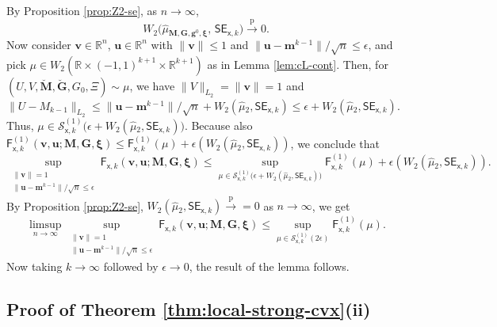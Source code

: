 \documentclass[]{article}
\def\sx{{\mathsf x}}
\def\bv{{\boldsymbol V}}
\def\bM{{\boldsymbol M}}
\def\bu{{\boldsymbol u}}
\def\bg{{\boldsymbol g}}
\def\bv{{\boldsymbol v}}
\def\bxi{{\boldsymbol \xi}}
\def\reals{{\mathbb R}}
\def\bG{{\boldsymbol G}}
\def\bv{{\boldsymbol v}}
\def\bu{{\boldsymbol u}}
\def\bg{{\boldsymbol g}}
\def\cS{{\mathcal S}}
\def\bbm{{\boldsymbol m}}
\def\cS{{\mathcal S}}
\def\muhat{\widehat{\mu}{}}
\def\pconv{\stackrel{\mathrm{p}}\rightarrow}
\def\sF{\mathsf{F}}
\def\brevebM{\breve{\boldsymbol{M}}{}}
\def\brevebG{\breve{\boldsymbol{G}}{}}
\def\SE{\mathsf{SE}}
\begin{document}
By Proposition \ref{prop:Z2-se}, 
as $n \rightarrow \infty$, 
\begin{equation}
    W_2\big(
        \muhat_{\bM,\bG,\bg^0,\bxi} ,\,
        \SE_{\sx,k}
    \big) 
    \pconv 0.
\end{equation}
Now consider $\bv \in \reals^n$, $\bu \in \reals^n$ with $\| \bv \| \leq 1$ and $\| \bu - \bbm^{k-1} \|/\sqrt{n} \leq \epsilon$,
and pick $\mu \in W_2(\reals \times (-1,1)^{k+1} \times \reals^{k+1})$ as in Lemma \ref{lem:cL-cont}.
Then,
for $(U,V,\brevebM,\brevebG,G_0,\Xi) \sim \mu$,
we have $\| V \|_{L_2} = \| \bv \| = 1$
and $\| U  - M_{k-1} \|_{L_2} \leq \| \bu - \bbm^{k-1} \| / \sqrt{n} + W_2(\muhat_2,\SE_{\sx,k}) \leq \epsilon +W_2(\muhat_2,\SE_{\sx,k}) $.
Thus,
$\mu \in \cS_{\sx,k}^{(1)}\big(\epsilon +W_2(\muhat_2,\SE_{\sx,k})\big)$.
Because also $\sF_{\sx,k}^{(1)}(\bv,\bu;\bM,\bG,\bxi) \leq \sF_{\sx,k}^{(1)}(\mu) + \epsilon(W_2(\muhat_2,\SE_{\sx,k}))$,
we conclude that 
\begin{equation}
    \sup_{\substack{ \| \bv \| = 1\\ 
                         \| \bu - \bbm^{k-1} \|/\sqrt{n} \leq \epsilon } }
            \sF_{\sx,k}(\bv,\bu;\bM,\bG,\bxi)
    \leq 
    \sup_{\mu \in \cS_{\sx,k}^{(1)}\big(\epsilon +W_2(\muhat_2,\SE_{\sx,k})\big)}
            \sF^{(1)}_{\sx,k}(\mu) + \epsilon(W_2(\muhat_2,\SE_{\sx,k})).
\end{equation} 
By Proposition \ref{prop:Z2-se}, $W_2(\muhat_2,\SE_{\sx,k}) \pconv =0$ as $n\rightarrow \infty$,
we get 
\begin{equation}
    \limsup_{n \rightarrow \infty}
        \sup_{\substack{ \| \bv \| = 1\\ 
                         \| \bu - \bbm^{k-1} \|/\sqrt{n} \leq \epsilon } }
            \sF_{\sx,k}(\bv,\bu;\bM,\bG,\bxi)
    \leq 
    \sup_{\mu \in \cS_{\sx,k}^{(1)}(2\epsilon)}
            \sF^{(1)}_{\sx,k}(\mu).
\end{equation}
Now taking $k \rightarrow \infty$ followed by $\epsilon \rightarrow 0$,
the result of the lemma follows.

\subsection{Proof of Theorem \ref{thm:local-strong-cvx}(ii)}
\label{app:unique-stat}
\end{document}

